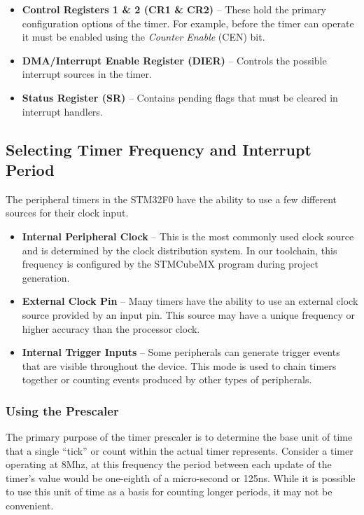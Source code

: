 \documentclass[11pt,fleqn]{book} %
\begin{document}
    \begin{itemize}
        \item \textbf{Control Registers 1 \& 2 (CR1 \& CR2)} -- These hold the primary configuration options of the timer. For example, before the timer can operate it must be enabled using the \textit{Counter Enable} (CEN) bit. 
        \item\textbf{DMA/Interrupt Enable Register (DIER)} -- Controls the possible interrupt sources in the timer.
        \item\textbf{Status Register (SR)} -- Contains pending flags that must be cleared in interrupt handlers.
    \end{itemize}

    \subsection{Selecting Timer Frequency and Interrupt Period}	
    The peripheral timers in the STM32F0 have the ability to use a few different sources for their clock input. 
    \begin{itemize}
        \item\textbf{Internal Peripheral Clock} -- This is the most commonly used clock source and is determined by the clock distribution system. In our toolchain, this frequency is configured by the STMCubeMX program during project generation. 
        \item\textbf{External Clock Pin} -- Many timers have the ability to use an external clock source provided by an input pin. This source may have a unique frequency or higher accuracy than the processor clock.
        \item\textbf{Internal Trigger Inputs} -- Some peripherals can generate trigger events that are visible throughout the device. This mode is used to chain timers together or counting events produced by other types of peripherals.
    \end{itemize}
 
    \subsubsection{Using the Prescaler}
      
        The primary purpose of the timer prescaler is to determine the base unit of time that a single ``tick'' or count within the actual timer represents. Consider a timer operating at 8Mhz, at this frequency the period between each update of the timer's value would be one-eighth of a micro-second or 125ns. While it is possible to use this unit of time as a basis for counting longer periods, it may not be convenient. 
        
\end{document}
